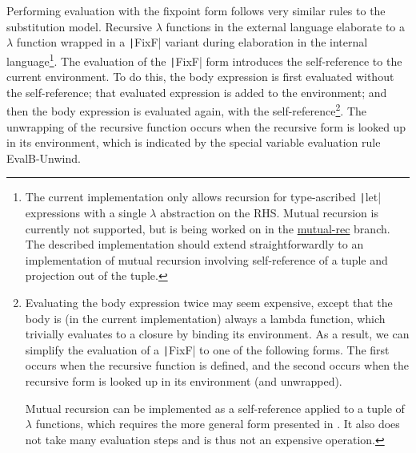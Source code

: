 Performing evaluation with the fixpoint form follows very similar rules to the substitution model. Recursive $\lambda$ functions in the external language elaborate to a $\lambda$ function wrapped in a \texttt|FixF| variant during elaboration in the internal language\footnote{The current implementation only allows recursion for type-ascribed \texttt|let| expressions with a single $\lambda$ abstraction on the RHS. Mutual recursion is currently not supported, but is being worked on in the \href{https://github.com/hazelgrove/hazel/tree/mutual-rec}{mutual-rec} branch. The described implementation should extend straightforwardly to an implementation of mutual recursion involving self-reference of a tuple and projection out of the tuple.}. The evaluation of the \texttt|FixF| form introduces the self-reference to the current environment. To do this, the body expression is first evaluated without the self-reference; that evaluated expression is added to the environment; and then the body expression is evaluated again, with the self-reference\footnote{Evaluating the body expression twice may seem expensive, except that the body is (in the current implementation) always a lambda function, which trivially evaluates to a closure by binding its environment. As a result, we can simplify the evaluation of a \texttt|FixF| to one of the following forms. The first occurs when the recursive function is defined, and the second occurs when the recursive form is looked up in its environment (and unwrapped).
  Mutual recursion can be implemented as a self-reference applied to a tuple of $\lambda$ functions, which requires the more general form presented in . It also does not take many evaluation steps and is thus not an expensive operation.}. The unwrapping of the recursive function occurs when the recursive form is looked up in its environment, which is indicated by the special variable evaluation rule EvalB-Unwind.

